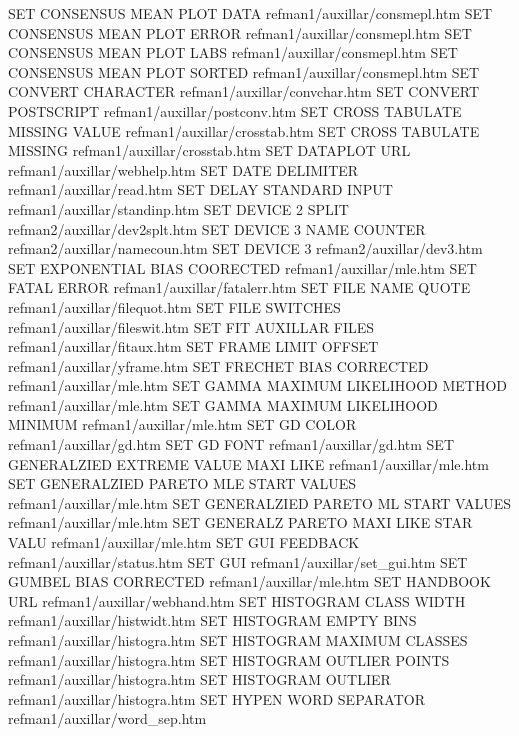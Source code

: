 SET CONSENSUS MEAN PLOT DATA            refman1/auxillar/consmepl.htm
SET CONSENSUS MEAN PLOT ERROR           refman1/auxillar/consmepl.htm
SET CONSENSUS MEAN PLOT LABS            refman1/auxillar/consmepl.htm
SET CONSENSUS MEAN PLOT SORTED          refman1/auxillar/consmepl.htm
SET CONVERT CHARACTER                   refman1/auxillar/convchar.htm
SET CONVERT POSTSCRIPT                  refman1/auxillar/postconv.htm
SET CROSS TABULATE MISSING VALUE        refman1/auxillar/crosstab.htm
SET CROSS TABULATE MISSING              refman1/auxillar/crosstab.htm
SET DATAPLOT URL                        refman1/auxillar/webhelp.htm
SET DATE DELIMITER                      refman1/auxillar/read.htm
SET DELAY STANDARD INPUT                refman1/auxillar/standinp.htm
SET DEVICE 2 SPLIT                      refman2/auxillar/dev2splt.htm
SET DEVICE 3 NAME COUNTER               refman2/auxillar/namecoun.htm
SET DEVICE 3                            refman2/auxillar/dev3.htm
SET EXPONENTIAL BIAS COORECTED          refman1/auxillar/mle.htm
SET FATAL ERROR                         refman1/auxillar/fatalerr.htm
SET FILE NAME QUOTE                     refman1/auxillar/filequot.htm
SET FILE SWITCHES                       refman1/auxillar/fileswit.htm
SET FIT AUXILLAR FILES                  refman1/auxillar/fitaux.htm
SET FRAME LIMIT OFFSET                  refman1/auxillar/yframe.htm
SET FRECHET BIAS CORRECTED              refman1/auxillar/mle.htm
SET GAMMA MAXIMUM LIKELIHOOD METHOD     refman1/auxillar/mle.htm
SET GAMMA MAXIMUM LIKELIHOOD MINIMUM    refman1/auxillar/mle.htm
SET GD COLOR                            refman1/auxillar/gd.htm
SET GD FONT                             refman1/auxillar/gd.htm
SET GENERALZIED EXTREME VALUE MAXI LIKE refman1/auxillar/mle.htm
SET GENERALZIED PARETO MLE START VALUES refman1/auxillar/mle.htm
SET GENERALZIED PARETO ML START VALUES  refman1/auxillar/mle.htm
SET GENERALZ PARETO MAXI LIKE STAR VALU refman1/auxillar/mle.htm
SET GUI FEEDBACK                        refman1/auxillar/status.htm
SET GUI                                 refman1/auxillar/set_gui.htm
SET GUMBEL BIAS CORRECTED               refman1/auxillar/mle.htm
SET HANDBOOK URL                        refman1/auxillar/webhand.htm
SET HISTOGRAM CLASS WIDTH               refman1/auxillar/histwidt.htm
SET HISTOGRAM EMPTY BINS                refman1/auxillar/histogra.htm
SET HISTOGRAM MAXIMUM CLASSES           refman1/auxillar/histogra.htm
SET HISTOGRAM OUTLIER POINTS            refman1/auxillar/histogra.htm
SET HISTOGRAM OUTLIER                   refman1/auxillar/histogra.htm
SET HYPEN WORD SEPARATOR                refman1/auxillar/word_sep.htm
